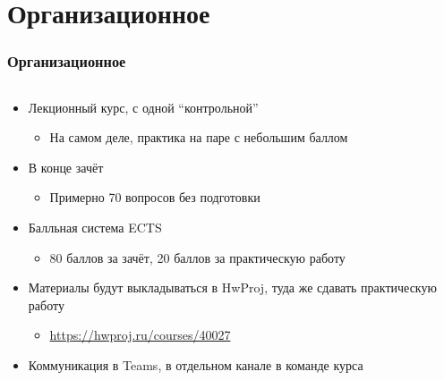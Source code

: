 \documentclass{../../slides-style}
\begin{document}
    \begin{frame}[plain]
        \titlepage
    \end{frame}

    \section{Организационное}

    \begin{frame}
        \frametitle{Организационное}
        \begin{columns}
            \begin{column}{0.7\textwidth}
                \begin{itemize}
                    \item Лекционный курс, с одной \enquote{контрольной}
                    \begin{itemize}
                        \item На самом деле, практика на паре с небольшим баллом
                    \end{itemize}
                    \item В конце зачёт
                    \begin{itemize}
                        \item Примерно 70 вопросов без подготовки
                    \end{itemize}
                    \item Балльная система ECTS
                    \begin{itemize}
                        \item 80 баллов за зачёт, 20 баллов за практическую работу
                    \end{itemize}
                    \item Материалы будут выкладываться в HwProj, туда же сдавать практическую работу
                    \begin{itemize}
                        \item \url{https://hwproj.ru/courses/40027}
                    \end{itemize}
                    \item Коммуникация в Teams, в отдельном канале в команде курса
                \end{itemize}
            \end{column}
            \begin{column}{0.3\textwidth}
                \begin{center}

\end{center}
\end{column}
\end{columns}
\end{frame}
\end{document}
